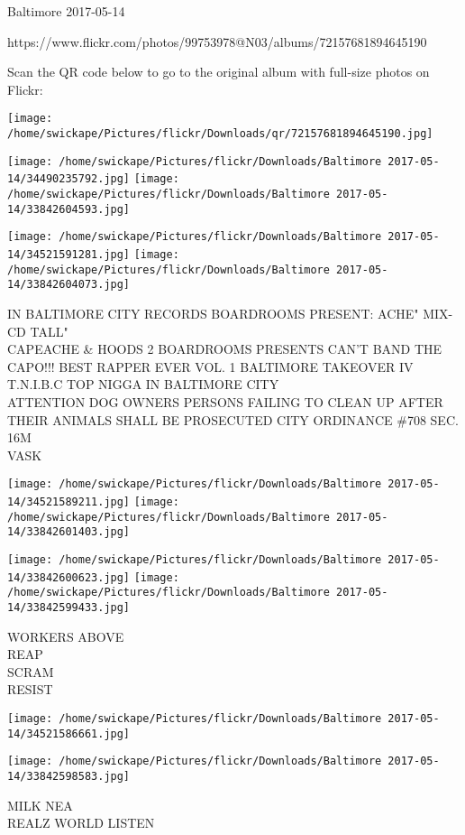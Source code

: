 \documentclass[10pt,letterpaper]{article}
\begin{document}
Baltimore 2017-05-14

https://www.flickr.com/photos/99753978@N03/albums/72157681894645190

Scan the QR code below to go to the original album with full-size photos on Flickr:

\texttt{[image: /home/swickape/Pictures/flickr/Downloads/qr/72157681894645190.jpg]}
\pagebreak

\texttt{[image: /home/swickape/Pictures/flickr/Downloads/Baltimore 2017-05-14/34490235792.jpg]}
\texttt{[image: /home/swickape/Pictures/flickr/Downloads/Baltimore 2017-05-14/33842604593.jpg]}

\texttt{[image: /home/swickape/Pictures/flickr/Downloads/Baltimore 2017-05-14/34521591281.jpg]}
\texttt{[image: /home/swickape/Pictures/flickr/Downloads/Baltimore 2017-05-14/33842604073.jpg]}

IN BALTIMORE CITY RECORDS BOARDROOMS PRESENT: ACHE" MIX{-}CD TALL"\\
CAPEACHE \& HOODS 2 BOARDROOMS PRESENTS CAN'T BAND THE CAPO!!! BEST RAPPER EVER VOL. 1 BALTIMORE TAKEOVER IV T.N.I.B.C TOP NIGGA IN BALTIMORE CITY\\
ATTENTION DOG OWNERS PERSONS FAILING TO CLEAN UP AFTER THEIR ANIMALS SHALL BE PROSECUTED CITY ORDINANCE \#708 SEC. 16M\\
VASK
\pagebreak

\texttt{[image: /home/swickape/Pictures/flickr/Downloads/Baltimore 2017-05-14/34521589211.jpg]}
\texttt{[image: /home/swickape/Pictures/flickr/Downloads/Baltimore 2017-05-14/33842601403.jpg]}

\texttt{[image: /home/swickape/Pictures/flickr/Downloads/Baltimore 2017-05-14/33842600623.jpg]}
\texttt{[image: /home/swickape/Pictures/flickr/Downloads/Baltimore 2017-05-14/33842599433.jpg]}

WORKERS ABOVE\\
REAP\\
SCRAM\\
RESIST
\pagebreak

\texttt{[image: /home/swickape/Pictures/flickr/Downloads/Baltimore 2017-05-14/34521586661.jpg]}

\vspace{0.25in}
\texttt{[image: /home/swickape/Pictures/flickr/Downloads/Baltimore 2017-05-14/33842598583.jpg]}

MILK NEA\\
REALZ WORLD LISTEN
\pagebreak
\end{document}
